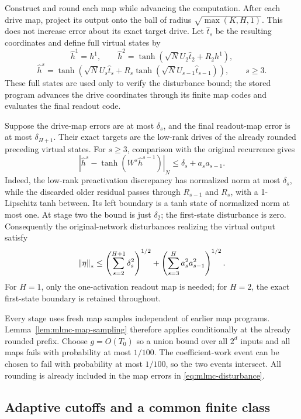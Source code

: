 Construct and round each map while advancing the computation. After
each drive map, project its output onto the ball of radius
$\sqrt{\max(K,H,1)}$. This does not increase error about its exact
target drive. Let $\widehat t_s$ be the resulting coordinates and
define full virtual states by
\[
 \widehat h^1=h^1,\qquad
 \widehat h^2=\tanh(\sqrt N U_2\widehat t_2+R_2h^1),
\]
\begin{equation}\label{eq:mlmc-virtual-state}
 \widehat h^s=\tanh\left(\sqrt N U_s\widehat t_s+
                  R_s\tanh(\sqrt N U_{s-1}\widehat t_{s-1})\right),
 \qquad s\ge3.
\end{equation}
These full states are used only to verify the disturbance bound; the
stored program advances the drive coordinates through its finite map
codes and evaluates the final readout code.

Suppose the drive-map errors are at most $\delta_s$, and the final
readout-map error is at most $\delta_{H+1}$. Their exact targets are
the low-rank drives of the already rounded preceding virtual states.
For $s\ge3$, comparison with the original recurrence gives
\[
 |\widehat h^s-\tanh(W^s\widehat h^{s-1})|_N
 \le\delta_s+a_sa_{s-1}.
\]
Indeed, the low-rank preactivation discrepancy has normalized norm
at most $\delta_s$, while the discarded older residual passes through
$R_{s-1}$ and $R_s$, with a 1-Lipschitz tanh between. Its left boundary
is a tanh state of normalized norm at most one. At stage two the bound
is just $\delta_2$; the first-state disturbance is zero. Consequently
the original-network disturbances realizing the virtual output satisfy
\begin{equation}\label{eq:mlmc-disturbance}
 \left\|\eta\right\|_*
 \le\left(\sum_{s=2}^{H+1}\delta_s^2\right)^{1/2}
   +\left(\sum_{s=3}^H a_s^2a_{s-1}^2\right)^{1/2}.
\end{equation}
For $H=1$, only the one-activation readout map is needed; for $H=2$,
the exact first-state boundary is retained throughout.

Every stage uses fresh map samples independent of earlier map programs.
Lemma~\ref{lem:mlmc-map-sampling} therefore applies conditionally at
the already rounded prefix. Choose $g=O(T_0)$ so a union bound over
all $2^d$ inputs and all maps fails with probability at most $1/100$.
The coefficient-work event can be chosen to fail with probability at
most $1/100$, so the two events intersect. All rounding is already
included in the map errors in \eqref{eq:mlmc-disturbance}.

\subsection{Adaptive cutoffs and a common finite class}

